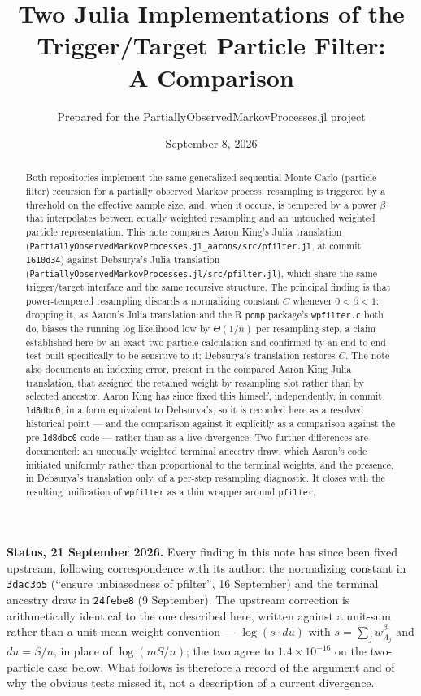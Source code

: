 \documentclass[10pt]{article}
\title{Two Julia Implementations of the Trigger/Target Particle Filter:\\
A Comparison}
\author{Prepared for the PartiallyObservedMarkovProcesses.jl project}
\date{September 8, 2026}
\begin{document}
\maketitle

\begin{abstract}
Both repositories implement the same generalized sequential Monte Carlo
(particle filter) recursion for a partially observed Markov process:
resampling is triggered by a threshold on the effective sample size, and,
when it occurs, is tempered by a power $\beta$ that interpolates between
equally weighted resampling and an untouched weighted particle
representation. This note compares Aaron King's Julia translation
(\texttt{PartiallyObservedMarkovProcesses.jl\_aarons/src/pfilter.jl}, at
commit \texttt{1610d34}) against Debsurya's Julia translation
(\texttt{PartiallyObservedMarkovProcesses.jl/src/pfilter.jl}), which share
the same trigger/target interface and the same recursive structure. The
principal finding is that power-tempered resampling discards a normalizing
constant $C$ whenever $0<\beta<1$: dropping it, as Aaron's Julia translation
and the R \texttt{pomp} package's \texttt{wpfilter.c} both do, biases the
running log likelihood low by $\Theta(1/n)$ per resampling step, a claim
established here by an exact two-particle calculation and confirmed by an
end-to-end test built specifically to be sensitive to it; Debsurya's
translation restores $C$. The note also documents an indexing error, present
in the compared Aaron King Julia translation, that assigned the retained
weight by resampling slot rather than by selected ancestor. Aaron King has
since fixed this himself, independently, in commit \texttt{1d8dbc0}, in a
form equivalent to Debsurya's, so it is recorded here as a resolved
historical point --- and the comparison against it explicitly as a
comparison against the pre-\texttt{1d8dbc0} code --- rather than as a live
divergence. Two further differences are documented: an unequally weighted
terminal ancestry draw, which Aaron's code initiated uniformly rather than
proportional to the terminal weights, and the presence, in Debsurya's
translation only, of a per-step resampling diagnostic. It closes
with the resulting unification of \texttt{wpfilter} as a thin wrapper around
\texttt{pfilter}.
\end{abstract}
\vspace{0.6em}
\noindent\textbf{Status, 21 September 2026.}\; Every finding in this note has
since been fixed upstream, following correspondence with its author: the
normalizing constant in \texttt{3dac3b5} (``ensure unbiasedness of pfilter'',
16 September) and the terminal ancestry draw in \texttt{24febe8}
(9 September). The upstream correction is arithmetically identical to the one
described here, written against a unit-sum rather than a unit-mean weight
convention --- $\log(s\cdot du)$ with $s=\sum_j w_{A_j}^\beta$ and $du=S/n$,
in place of $\log(mS/n)$; the two agree to $1.4\times10^{-16}$ on the
two-particle case below. What follows is therefore a record of the argument
and of why the obvious tests missed it, not a description of a current
divergence.
\end{document}
